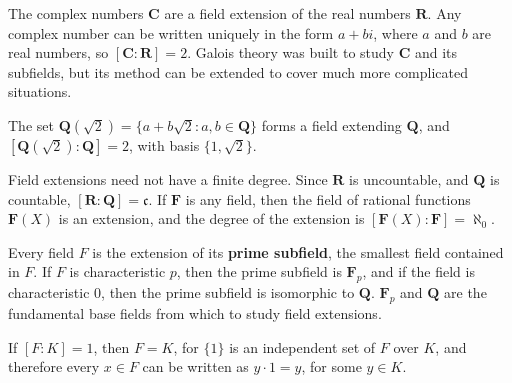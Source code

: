 \begin{example}
    The complex numbers $\mathbf{C}$ are a field extension of the real numbers $\mathbf{R}$. Any complex number can be written uniquely in the form $a + bi$, where $a$ and $b$ are real numbers, so $[\mathbf{C}: \mathbf{R}] = 2$. Galois theory was built to study $\mathbf{C}$ and its subfields, but its method can be extended to cover much more complicated situations.
\end{example}

\begin{example}
    The set $\mathbf{Q}(\sqrt{2}) = \{ a + b \sqrt{2} : a,b \in \mathbf{Q} \}$ forms a field extending $\mathbf{Q}$, and $[\mathbf{Q}(\sqrt{2}): \mathbf{Q}] = 2$, with basis $\{ 1, \sqrt{2} \}$.
\end{example}

\begin{example}
    Field extensions need not have a finite degree. Since $\mathbf{R}$ is uncountable, and $\mathbf{Q}$ is countable, $[\mathbf{R}: \mathbf{Q}] = \mathfrak{c}$. If $\mathbf{F}$ is any field, then the field of rational functions $\mathbf{F}(X)$ is an extension, and the degree of the extension is $[\mathbf{F}(X) : \mathbf{F}] = \aleph_0$.
\end{example}

\begin{example}
    Every field $F$ is the extension of its {\bf prime subfield}, the smallest field contained in $F$. If $F$ is characteristic $p$, then the prime subfield is $\mathbf{F}_p$, and if the field is characteristic 0, then the prime subfield is isomorphic to $\mathbf{Q}$. $\mathbf{F}_p$ and $\mathbf{Q}$ are the fundamental base fields from which to study field extensions.
\end{example}

\begin{example}
    If $[F:K] = 1$, then $F = K$, for $\{ 1 \}$ is an independent set of $F$ over $K$, and therefore every $x \in F$ can be written as $y \cdot 1 = y$, for some $y \in K$.
\end{example}

